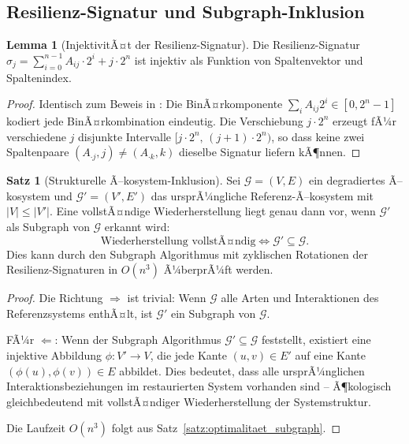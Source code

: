 ﻿\documentclass[a4paper,12pt]{article}
\theoremstyle{definition}
\newtheorem{satz}{Satz}
\newtheorem{lemma}{Lemma}
\begin{document}
\subsection{Resilienz-Signatur und Subgraph-Inklusion}

\begin{lemma}[InjektivitÃ¤t der Resilienz-Signatur]
	Die Resilienz-Signatur $\sigma_j = \sum_{i=0}^{n-1} A_{ij} \cdot 2^i + j \cdot 2^n$ ist injektiv als Funktion von Spaltenvektor und Spaltenindex.
\end{lemma}

\begin{proof}
	Identisch zum Beweis in \cite{epp2026subgraph}: Die BinÃ¤rkomponente $\sum_i A_{ij} 2^i \in [0, 2^n - 1]$ kodiert jede BinÃ¤rkombination eindeutig. Die Verschiebung $j \cdot 2^n$ erzeugt fÃ¼r verschiedene $j$ disjunkte Intervalle $[j\cdot 2^n,\, (j+1)\cdot 2^n)$, so dass keine zwei Spaltenpaare $(A_{\cdot j}, j) \neq (A_{\cdot k}, k)$ dieselbe Signatur liefern kÃ¶nnen. \qedhere
\end{proof}

\begin{satz}[Strukturelle Ã–kosystem-Inklusion]
	Sei $\mathcal{G} = (V, E)$ ein degradiertes Ã–kosystem und $\mathcal{G}' = (V', E')$ das ursprÃ¼ngliche Referenz-Ã–kosystem mit $|V| \leq |V'|$. Eine vollstÃ¤ndige Wiederherstellung liegt genau dann vor, wenn $\mathcal{G}'$ als Subgraph von $\mathcal{G}$ erkannt wird:
	\[
	\text{Wiederherstellung vollstÃ¤ndig} \iff \mathcal{G}' \subseteq \mathcal{G}.
	\]
	Dies kann durch den Subgraph Algorithmus mit zyklischen Rotationen der Resilienz-Signaturen in $O(n^3)$ Ã¼berprÃ¼ft werden.
\end{satz}

\begin{proof}
	Die Richtung $\Rightarrow$ ist trivial: Wenn $\mathcal{G}$ alle Arten und Interaktionen des Referenzsystems enthÃ¤lt, ist $\mathcal{G}'$ ein Subgraph von $\mathcal{G}$.

	FÃ¼r $\Leftarrow$: Wenn der Subgraph Algorithmus $\mathcal{G}' \subseteq \mathcal{G}$ feststellt, existiert eine injektive Abbildung $\phi: V' \to V$, die jede Kante $(u,v) \in E'$ auf eine Kante $(\phi(u), \phi(v)) \in E$ abbildet. Dies bedeutet, dass alle ursprÃ¼nglichen Interaktionsbeziehungen im restaurierten System vorhanden sind -- Ã¶kologisch gleichbedeutend mit vollstÃ¤ndiger Wiederherstellung der Systemstruktur.

	Die Laufzeit $O(n^3)$ folgt aus Satz~\ref{satz:optimalitaet_subgraph}. \qedhere
\end{proof}
\end{document}

